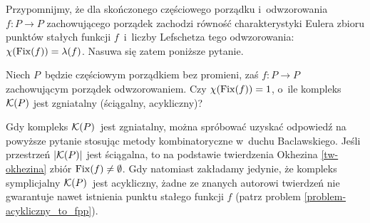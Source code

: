 Przypomnijmy, że dla skończonego częściowego porządku i~odwzorowania $f\colon P\to P$ zachowującego porządek zachodzi równość charakterystyki Eulera zbioru punktów stałych funkcji $f$~i~liczby Lefschetza tego odwzorowania: $\chi(\operatorname{Fix}(f))=\lambda(f)$. Nasuwa się zatem poniższe pytanie.
\begin{problem}\label{prob101}
Niech $P$~będzie częściowym porządkiem bez promieni, zaś $f\colon P\to P$ zachowującym porządek odwzorowaniem. Czy $\chi(\operatorname{Fix}(f))=1$, o~ile kompleks $\mathcal{K}(P)$ jest zgniatalny (ściągalny, acykliczny)?
\end{problem}
Gdy kompleks $\mathcal{K}(P)$~jest zgniatalny, można spróbować uzyskać odpowiedź na powyższe pytanie stosując metody kombinatoryczne w~duchu Baclawskiego. Jeśli przestrzeń $|\mathcal{K}(P)|$ jest ściągalna, to na podstawie twierdzenia Okhezina \ref{tw-okhezina} zbiór $\operatorname{Fix}(f)\not=\emptyset$. Gdy natomiast zakładamy jedynie, że kompleks symplicjalny $\mathcal{K}(P)$~jest acykliczny, żadne ze znanych autorowi twierdzeń nie gwarantuje nawet istnienia punktu stałego funkcji $f$ (patrz problem \ref{problem-acykliczny_to_fpp}).


\begin{comment}



\section{Wielościany promień-właściwe i~punkty stałe ich promień-właściwych odwzorowań}
(do napisania)



\subsection{Wielościany i~odwzorowania promień-właściwe}
(do napisania)



\subsection{Twierdzenie o~punkcie lub końcu stałym dla oswojonych do wewnątrz wielościanów promień-właściwych}
(do napisania)
\end{comment}

